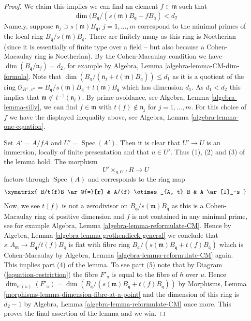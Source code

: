 \documentclass[10pt,a4paper]{amsart}
\theoremstyle{plain}
\theoremstyle{definition}
\theoremstyle{remark}
\numberwithin{equation}{subsection}
\def\Spec{\mathop{\mathrm{Spec}}}
\begin{document}
\begin{proof}
\medskip\noindent
We claim this implies we can find
an element $f \in \mathfrak m$ such that
$$
\dim(B_{\mathfrak q}/(s(\mathfrak m)B_{\mathfrak q} + fB_{\mathfrak q}) < d_2
$$
Namely, suppose $\mathfrak n_j \supset s(\mathfrak m)B_{\mathfrak q}$,
$j = 1, \ldots, m$ correspond to the minimal primes of the local ring
$B_{\mathfrak q}/s(\mathfrak m)B_{\mathfrak q}$.
There are finitely many as this ring is Noetherian (since it is essentially
of finite type over a field -- but also because a Cohen-Macaulay ring is
Noetherian). By the Cohen-Macaulay condition we have
$\dim(B_{\mathfrak q}/\mathfrak n_j) = d_2$, for example by
Algebra, Lemma \ref{algebra-lemma-CM-dim-formula}.
Note that
$\dim(B_{\mathfrak q}/(\mathfrak n_j + t(\mathfrak m)B_{\mathfrak q}))
\leq d_1$
as it is a quotient of the ring
$\mathcal{O}_{R'', e''} =
B_{\mathfrak q}/s(\mathfrak m)B_{\mathfrak q} + t(\mathfrak m)B_{\mathfrak q}$
which has dimension $d_1$. As $d_1 < d_2$ this implies that
$\mathfrak m \not \subset t^{-1}(\mathfrak n_i)$.
By prime avoidance, see
Algebra, Lemma \ref{algebra-lemma-silly},
we can find $f \in \mathfrak m$ with $t(f) \not \in \mathfrak n_j$ for
$j = 1, \ldots, m$. For this choice of $f$ we have
the displayed inequality above, see
Algebra, Lemma \ref{algebra-lemma-one-equation}.

\medskip\noindent
Set $A' = A/fA$ and $U' = \Spec(A')$. Then it is clear that
$U' \to U$ is an immersion, locally of finite presentation
and that $u \in U'$. Thus (1), (2) and (3) of the lemma hold.
The morphism
$$
U' \times_{g, U, t} R \longrightarrow U
$$
factors through $\Spec(A)$ and corresponds to the ring map
$$
\xymatrix{
B/t(f)B \ar@{=}[r] & A/(f) \otimes_{A, t} B & A \ar[l]_-s
}
$$
Now, we see $t(f)$ is not a zerodivisor on
$B_{\mathfrak q}/s(\mathfrak m)B_{\mathfrak q}$ as this is a
Cohen-Macaulay ring of positive dimension and $f$ is not contained
in any minimal prime, see for example
Algebra, Lemma \ref{algebra-lemma-reformulate-CM}.
Hence by
Algebra, Lemma \ref{algebra-lemma-grothendieck-general}
we conclude that $s : A_{\mathfrak m} \to B_{\mathfrak q}/t(f)B_{\mathfrak q}$
is flat with fibre ring
$B_{\mathfrak q}/(s(\mathfrak m)B_{\mathfrak q} + t(f)B_{\mathfrak q})$
which is Cohen-Macaulay by
Algebra, Lemma \ref{algebra-lemma-reformulate-CM}
again. This implies part (4) of the lemma.
To see part (5) note that by Diagram (\ref{equation-restriction})
the fibre $F'_u$ is equal to the fibre of $h$ over $u$.
Hence
$\dim_{e'(u)}(F'_u) =
\dim(B_{\mathfrak q}/(s(\mathfrak m)B_{\mathfrak q} + t(f)B_{\mathfrak q}))$
by
Morphisms, Lemma \ref{morphisms-lemma-dimension-fibre-at-a-point}
and the dimension of this ring is $d_2 - 1$ by
Algebra, Lemma \ref{algebra-lemma-reformulate-CM}
once more. This proves the final assertion of the lemma and we win.
\end{proof}



\end{document}
